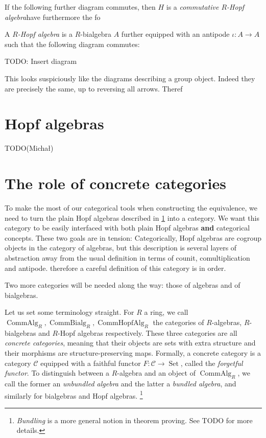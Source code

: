 \documentclass{article}
\newcommand{\mcC}{\mathcal C}
\DeclareMathOperator{\Set}{Set}
\DeclareMathOperator{\CommAlg}{CommAlg}
\DeclareMathOperator{\CommBialg}{CommBialg}
\DeclareMathOperator{\CommHopfAlg}{CommHopfAlg}
\begin{document}
If the following further diagram commutes, then $H$ is a \emph{commutative $R$-Hopf algebra}have furthermore the fo

A \emph{$R$-Hopf algebra} is a $R$-bialgebra $A$ further equipped with an antipode $\iota : A \to A$
such that the following diagram commutes:

TODO: Insert diagram

This looks suspiciously like the diagrams describing a group object.
Indeed they are precisely the same, up to reversing all arrows.
Theref


\section{Hopf algebras}\label{sec:hopf}


TODO(Michał)


\section{The role of concrete categories}\label{sec:concrete-categories}


To make the most of our categorical tools when constructing the equivalence, we need to turn the plain Hopf algebras described in \cref{sec:hopf} into a category.
We want this category to be easily interfaced with both plain Hopf algebras {\bf and} categorical concepts.
These two goals are in tension:
Categorically, Hopf algebras are cogroup objects in the category of algebras, but this description is several layers of abstraction away from the usual definition in terms of counit, comultiplication and antipode. therefore a careful definition of this category is in order.

Two more categories will be needed along the way: those of algebras and of bialgebras.

Let us set some terminology straight.
For $R$ a ring, we call $\CommAlg_R, \CommBialg_R, \CommHopfAlg_R$ the categories of $R$-algebras, $R$-bialgebras and $R$-Hopf algebras respectively.
These three categories are all \emph{concrete categories}, meaning that their objects are sets with extra structure and their morphisms are structure-preserving maps.
Formally, a concrete category is a category $\mcC$ equipped with a faithful functor $F : \mcC \to \Set$, called the \emph{forgetful functor}.
To distinguish between a $R$-algebra and an object of $\CommAlg_R$, we call the former an \emph{unbundled algebra} and the latter a \emph{bundled algebra}, and similarly for bialgebras and Hopf algebras.
\footnote{\emph{Bundling} is a more general notion in theorem proving. See TODO for more details.}
\end{document}
